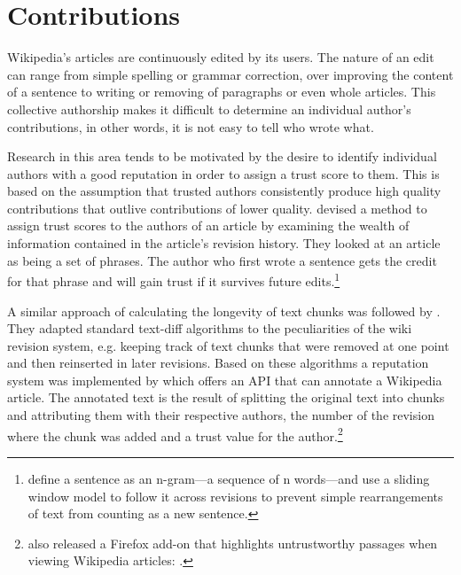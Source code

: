 \section{Contributions}\label{sec:contribution}

Wikipedia's articles are continuously edited by its users.
The nature of an edit can range from simple spelling or grammar correction, over improving the content of a sentence to writing or removing of paragraphs or even whole articles. 
This collective authorship makes it difficult to determine an individual author's contributions, in other words, it is not easy to tell who wrote what.

Research in this area tends to be motivated by the desire to identify individual authors with a good reputation in order to assign a trust score to them.
This is based on the assumption that trusted authors consistently produce high quality contributions that outlive contributions of lower quality.
\textcite{kramer2008wiki} devised a method to assign trust scores to the authors of an article by examining the wealth of information contained in the article's revision history.
They looked at an article as being a set of phrases.
The author who first wrote a sentence gets the credit for that phrase and will gain trust if it survives future edits.\footnote{\textcite{kramer2008wiki} define a sentence as an n-gram---a sequence of n words---and use a sliding window model to follow it across revisions to prevent simple rearrangements of text from counting as a new sentence.}

A similar approach of calculating the longevity of text chunks was followed by \textcite{adler2007content}.
They adapted standard text-diff algorithms to the peculiarities of the wiki revision system, e.g. keeping track of text chunks that were removed at one point and then reinserted in later revisions.
Based on these algorithms a reputation system was implemented by \textcite{adler2008assigning} which offers an API that can annotate a Wikipedia article.
The annotated text is the result of splitting the original text into chunks and attributing them with their respective authors, the number of the revision where the chunk was added and a trust value for the author.\footnote{\citeauthor{adler2008assigning} also released a Firefox add-on that highlights untrustworthy passages when viewing Wikipedia articles: .}


